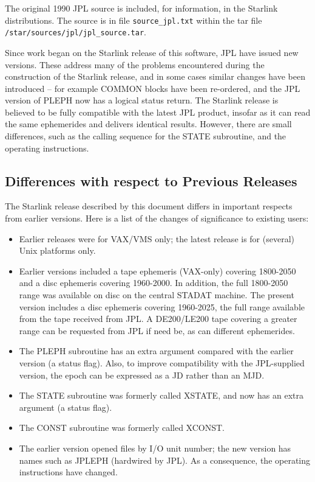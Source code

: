 \documentclass[twoside,11pt,nolof]{starlink}
\begin{document}
The original 1990 JPL source is included, for information, in the
Starlink distributions.  The source is in file \texttt{source\_jpl.txt}
within the tar file \texttt{/star/sources/jpl/jpl\_source.tar}.

Since work began on the Starlink release of this software, JPL have issued
new versions.  These address many of the problems encountered during
the construction of the Starlink release, and in some cases similar
changes have been introduced -- for example COMMON blocks have been
re-ordered, and the JPL version of PLEPH now has a logical status return.
The Starlink release is believed to be fully compatible with the latest
JPL product, insofar as it can read the same ephemerides and delivers
identical results.  However, there are small differences, such as the
calling sequence for the STATE subroutine, and the operating instructions.

\subsection{Differences with respect to Previous Releases}
\label{differences_with_respect_to_previous_releases}

The Starlink release described by this document differs in important
respects from earlier versions.  Here is a list of the changes of
significance to existing users: \begin{itemize}

\item Earlier releases were for VAX/VMS only; the latest release is for
(several) Unix platforms only.

\item Earlier versions included a tape ephemeris (VAX-only) covering
1800-2050 and a disc ephemeris covering 1960-2000.  In addition, the full
1800-2050 range was available on disc on the central STADAT machine. The
present version includes a disc ephemeris covering 1960-2025, the full
range available from the tape received from JPL.  A DE200/LE200 tape
covering a greater range can be requested from JPL if need be, as can
different ephemerides.

\item The PLEPH subroutine has an extra argument compared with the
earlier version (a status flag).  Also, to improve compatibility with
the JPL-supplied version, the epoch can be expressed as a JD rather than
an MJD.

\item The STATE subroutine was formerly called XSTATE, and now has an
extra argument (a status flag).

\item The CONST subroutine was formerly called XCONST.

\item The earlier version opened files by I/O unit number;  the new
version has names such as JPLEPH (hardwired by JPL).  As a consequence,
the operating instructions have changed.

\end{itemize}
\end{document}
